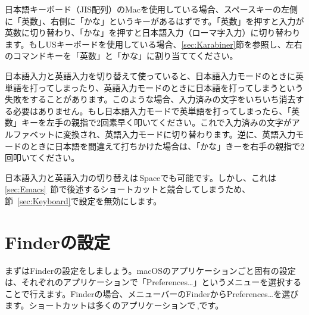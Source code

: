 日本語キーボード（JIS配列）のMacを使用している場合、スペースキーの左側に「英数」、右側に「かな」というキーがあるはずです。「英数」を押すと入力が英数に切り替わり、「かな」を押すと日本語入力（ローマ字入力）に切り替わります。もしUSキーボードを使用している場合、\ref{sec:Karabiner}節を参照し、左右のコマンドキーを「英数」と「かな」に割り当ててください。

日本語入力と英語入力を切り替えて使っていると、日本語入力モードのときに英単語を打ってしまったり、英語入力モードのときに日本語を打ってしまうという失敗をすることがあります。このような場合、入力済みの文字をいちいち消去する必要はありません。もし日本語入力モードで英単語を打ってしまったら、「英数」キーを左手の親指で2回素早く叩いてください。これで入力済みの文字がアルファベットに変換され、英語入力モードに切り替わります。逆に、英語入力モードのときに日本語を間違えて打ちかけた場合は、「かな」きーを右手の親指で2回叩いてください。

日本語入力と英語入力の切り替えは\ctlkey\,Spaceでも可能です。しかし、これは\ref{sec:Emacs}~節で後述するショートカットと競合してしまうため、節~\ref{sec:Keyboard}で設定を無効にします。

\section{Finderの設定}
まずはFinderの設定をしましょう。macOSのアプリケーションごと固有の設定は、それぞれのアプリケーションで「Preferences…」というメニューを選択することで行えます。Finderの場合、メニューバーのFinderからPreferences…を選びます。ショートカットは多くのアプリケーションで\cmdkey\,,です。


